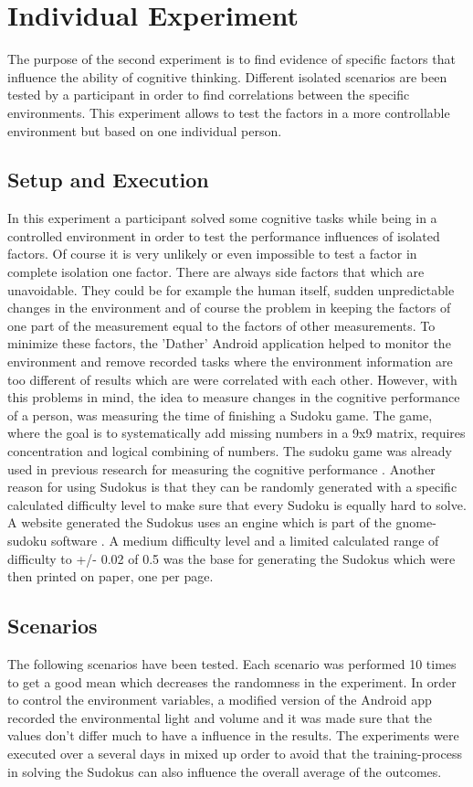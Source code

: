 { 
\section{Individual Experiment}
The purpose of the second experiment is to find evidence of specific factors that influence the ability of cognitive thinking. Different isolated scenarios are been tested by a participant in order to find correlations between the specific environments. 
This experiment allows to test the factors in a more controllable environment but based on one individual person. 

\subsection{Setup and Execution}
In this experiment a participant solved some cognitive tasks while being in a controlled environment in order to test the performance influences of isolated factors. 
Of course it is very unlikely or even impossible to test a factor in complete isolation one factor. There are always side factors that which are unavoidable. They could be for example the human itself, sudden unpredictable changes in the environment and of course the problem in keeping the factors of one part of the measurement equal to the factors of other measurements. 
To minimize these factors, the 'Dather' Android application helped to monitor the environment and remove recorded tasks where the environment information are too different of results which are were correlated with each other. 
However, with this problems in mind, the idea to measure changes in the cognitive performance of a person, was measuring the time of finishing a Sudoku game. 
The game, where the goal is to systematically add missing numbers in a 9x9 matrix, requires concentration and logical combining of numbers. 
The sudoku game was already used in previous research for measuring the cognitive performance \cite{sobolewski2009monitoring} \cite{xiang2009using}. 
Another reason for using Sudokus is that they can be randomly generated with a specific calculated difficulty level to make sure that every Sudoku is equally hard to solve. 
A website \cite{sudokugen} generated the Sudokus uses an engine which is part of the gnome-sudoku software \cite{gnomeSudoku}. 
A medium difficulty level and a limited calculated range of difficulty to +/- 0.02 of 0.5 was the base for generating the Sudokus which were then printed on paper, one per page. 

\subsection{Scenarios}
The following scenarios have been tested. Each scenario was performed 10 times to get a good mean which decreases the randomness in the experiment. In order to control the environment variables, a modified version of the Android app recorded the environmental light and volume and it was made sure that the values don't differ much to have a influence in the results. 
The experiments were executed over a several days in mixed up order to avoid that the training-process in solving the Sudokus can also influence the overall average of the outcomes.

}

